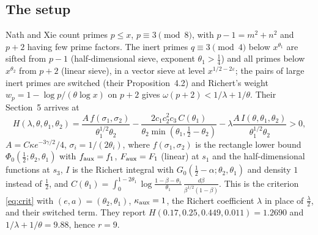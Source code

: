 \documentclass[11pt]{amsart}
\theoremstyle{remark}
\newcommand{\e}{\varepsilon}
\begin{document}
\subsection{The setup}
Nath and Xie \cite{NX} count primes $p\le x$, $p\equiv3\pmod 8$, with $p-1=m^2+n^2$ and $p+2$ having few prime factors. The inert primes $q\equiv3\pmod4$ below $x^{\theta_1}$ are sifted from $p-1$ (half-dimensional sieve, exponent $\theta_1>\frac14$) and all primes below $x^{\theta_2}$ from $p+2$ (linear sieve), in a vector sieve at level $x^{1/2-2\e}$; the pairs of large inert primes are switched (their Proposition~4.2) and Richert's weight $w_p=1-\log p/(\theta\log x)$ on $p+2$ gives $\omega(p+2)<1/\lambda+1/\theta$. Their Section~5 arrives at
\[
H(\lambda,\theta,\theta_1,\theta_2)=\frac{A\,f(\sigma_1,\sigma_2)}{\theta_1^{1/2}\theta_2}-\frac{2c_1c_2^2c_3\,C(\theta_1)}{\theta_2\min(\theta_1,\frac12-\theta_2)}-\lambda\frac{A\,I(\theta,\theta_1,\theta_2)}{\theta_1^{1/2}\theta_2}>0,
\]
$A=C\kappa e^{-3\gamma/2}/4$, $\sigma_i=1/(2\theta_i)$, where $f(\sigma_1,\sigma_2)$ is the rectangle lower bound $\Phi_0(\frac12;\theta_2,\theta_1)$ with $f_{\rm aux}=f_1$, $F_{\rm aux}=F_1$ (linear) at $s_1$ and the half-dimensional functions at $s_3$, $I$ is the Richert integral with $G_0(\frac12-\alpha;\theta_2,\theta_1)$ and density $1$ instead of $\frac12$, and $C(\theta_1)=\int_0^{1-2\theta_1}\log\frac{1-\beta-\theta_1}{\theta_1}\,\frac{d\beta}{\beta^{1/2}(1-\beta)}$. This is the criterion \eqref{eq:crit} with $(e,a)=(\theta_2,\theta_1)$, $\kappa_{\rm aux}=1$, the Richert coefficient $\lambda$ in place of $\frac\lambda2$, and their switched term. They report $H(0.17,0.25,0.449,0.011)=1.2690$ and $1/\lambda+1/\theta=9.88$, hence $r=9$.
\end{document}
